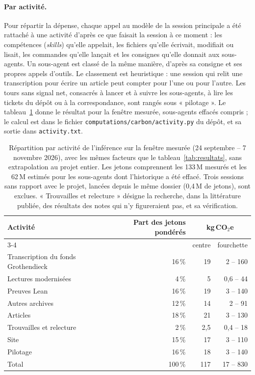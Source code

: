\documentclass[11pt,a4paper]{article}
\begin{document}
\paragraph{Par activité.} Pour répartir la dépense, chaque appel au modèle de la session principale a été rattaché à une activité d'après ce que faisait la session à ce moment : les compétences (\emph{skills}) qu'elle appelait, les fichiers qu'elle écrivait, modifiait ou lisait, les commandes qu'elle lançait et les consignes qu'elle donnait aux sous-agents. Un sous-agent est classé de la même manière, d'après sa consigne et ses propres appels d'outils. Le classement est heuristique : une session qui relit une transcription pour écrire un article peut compter pour l'une ou pour l'autre. Les tours sans signal net, consacrés à lancer et à suivre les sous-agents, à lire les tickets du dépôt ou à la correspondance, sont rangés sous « pilotage ». Le tableau~\ref{tab:activites} donne le résultat pour la fenêtre mesurée, sous-agents effacés compris ; le calcul est dans le fichier \texttt{computations/carbon/activity.py} du dépôt, et sa sortie dans \texttt{activity.txt}.

\begin{table}[h]\centering
\begin{tabular}{lrrr}
\toprule
Activité & Part des jetons pondérés & \multicolumn{2}{c}{kg\,CO$_2$e}\\
\cmidrule(l){3-4}
 & & centre & fourchette\\
\midrule
Transcription du fonds Grothendieck & 16\,\% & 19 & 2 -- 160\\
Lectures modernisées & 4\,\% & 5 & 0,6 -- 44\\
Preuves Lean & 16\,\% & 19 & 3 -- 140\\
Autres archives & 12\,\% & 14 & 2 -- 91\\
Articles & 18\,\% & 21 & 3 -- 130\\
Trouvailles et relecture & 2\,\% & 2,5 & 0,4 -- 18\\
Site & 15\,\% & 17 & 3 -- 110\\
Pilotage & 16\,\% & 18 & 3 -- 140\\
\midrule
Total & 100\,\% & 117 & 17 -- 830\\
\bottomrule
\end{tabular}
\caption{Répartition par activité de l'inférence sur la fenêtre mesurée (24 septembre -- 7 novembre 2026), avec les mêmes facteurs que le tableau~\ref{tab:resultats}, sans extrapolation au projet entier. Les jetons comprennent les 133\,M mesurés et les 62\,M estimés pour les sous-agents dont l'historique a été effacé. Trois sessions sans rapport avec le projet, lancées depuis le même dossier (0,4\,M de jetons), sont exclues. « Trouvailles et relecture » désigne la recherche, dans la littérature publiée, des résultats des notes qui n'y figureraient pas, et sa vérification.}\label{tab:activites}
\end{table}
\end{document}
